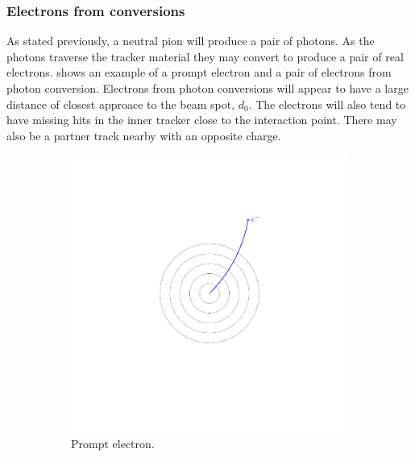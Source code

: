 \subsubsection{Electrons from conversions}
As stated previously, a neutral pion will produce a pair of photons. As the
photons traverse the tracker material they may convert to produce a pair of real
electrons. 
 shows an example of a prompt electron and a pair of
electrons from photon conversion.  Electrons from photon conversions will appear
to have a large distance of closest approace to the beam spot, $d_0$.
The electrons will also tend to have missing hits in the inner tracker close to
the interaction point.
There may also be a partner track nearby with an opposite charge.
\begin{figure}[htbp]
  \centering
  \begin{subfigure}{0.49\textwidth}
    \centering
    \includegraphics[trim = 35mm 40mm 30mm 30mm, clip,width=\textwidth]{doca_electron}
    \caption{Prompt electron.}
    \label{fig:electron_path}
  \end{subfigure}
  \begin{subfigure}{0.49\textwidth}
    \centering

\end{subfigure}
\end{figure}
